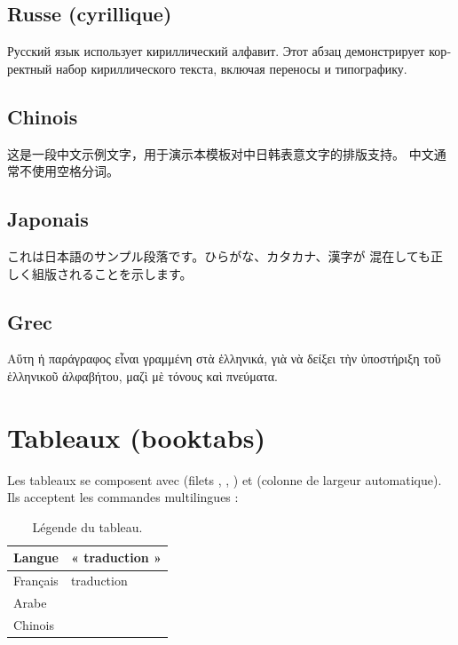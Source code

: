 \subsection{Russe (cyrillique)}
\begin{russian}
Русский язык использует кириллический алфавит. Этот абзац демонстрирует
корректный набор кириллического текста, включая переносы и
типографику.
\end{russian}

\subsection{Chinois}
\begin{chinese}
这是一段中文示例文字，用于演示本模板对中日韩表意文字的排版支持。
中文通常不使用空格分词。
\end{chinese}

\subsection{Japonais}
\begin{japanese}
これは日本語のサンプル段落です。ひらがな、カタカナ、漢字が
混在しても正しく組版されることを示します。
\end{japanese}

\subsection{Grec}
\begin{greek}
Αὕτη ἡ παράγραφος εἶναι γραμμένη στὰ ἑλληνικά, γιὰ νὰ δείξει τὴν
ὑποστήριξη τοῦ ἑλληνικοῦ ἀλφαβήτου, μαζὶ μὲ τόνους καὶ πνεύματα.
\end{greek}

\section{Tableaux (booktabs)}

Les tableaux se composent avec  (filets \code{\toprule},
\code{\midrule}, \code{\bottomrule}) et  (colonne 
de largeur automatique). Ils acceptent les commandes multilingues :

\begin{latexcode}
\begin{table}[htbp]
  \centering
  \begin{tabularx}{\linewidth}{@{}l X@{}}
    \toprule
    \textbf{Langue} & \textbf{« traduction »} \\
    \midrule
    Français & traduction \\
    Arabe    & \ar{ ... } \\
    Chinois  & \zh{ ... } \\
    \bottomrule
  \end{tabularx}
  \caption{Légende du tableau.}
  \label{tab:traduction}
\end{table}
\end{latexcode}

